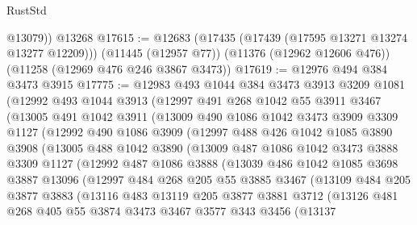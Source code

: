 \begin{lexlean}{RustStd}
\begin{coremodule}
{{{{{{{{{{{{{{{{{{{        @13079))
    @13268
@17615 := @12683
    (@17435 (@17439 (@17595 @13271 @13274 @13277 @12209)))
    (@11445 (@12957 @77))
    (@11376 (@12962 @12606 @476))
    (@11258 (@12969 @476 @246 @3867 @3473))
@17619 := @12976 @494 @384 @3473 @3915
@17775 := @12983
    @493
    @1044
    @384
    @3473
    @3913
    @3209
    @1081
    (@12992
      @493
      @1044
      @3913
      (@12997
        @491
        @268
        @1042
        @55
        @3911
        @3467
        (@13005
          @491
          @1042
          @3911
          (@13009
            @490
            @1086
            @1042
            @3473
            @3909
            @3309
            @1127
            (@12992
              @490
              @1086
              @3909
              (@12997
                @488
                @426
                @1042
                @1085
                @3890
                @3908
                (@13005
                  @488
                  @1042
                  @3890
                  (@13009
                    @487
                    @1086
                    @1042
                    @3473
                    @3888
                    @3309
                    @1127
                    (@12992
                      @487
                      @1086
                      @3888
                      (@13039
                        @486
                        @1042
                        @1085
                        @3698
                        @3887
                        @13096
                        (@12997
                          @484
                          @268
                          @205
                          @55
                          @3885
                          @3467
                          (@13109
                            @484
                            @205
                            @3877
                            @3883
                            (@13116
                              @483
                              @13119
                              @205
                              @3877
                              @3881
                              @3712
                              (@13126
                                @481
                                @268
                                @405
                                @55
                                @3874
                                @3473
                                @3467
                                @3577
                                @343
                                @3456
                                (@13137
}}}}}}}}}}}}}}}}}}}
\end{coremodule}
\end{lexlean}

